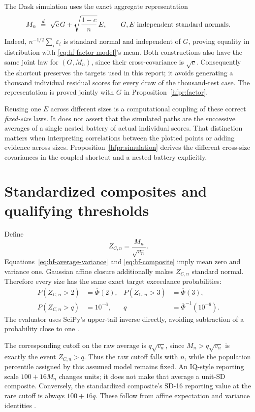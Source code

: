 The Dask simulation uses the exact aggregate representation
\begin{equation}
 M_n\ \stackrel{d}{=}\ \sqrt c\,G+
        \sqrt{\frac{1-c}{n}}\,E,
 \qquad G,E\ \hbox{independent standard normals}.
 \label{eq:hf-aggregate}
\end{equation}
Indeed, \(n^{-1/2}\sum_i\varepsilon_i\) is standard normal and independent
of \(G\), proving equality in distribution with
\eqref{eq:hf-factor-model}'s mean. Both constructions also have the same
joint law for \((G,M_n)\), since their cross-covariance is \(\sqrt c\).
Consequently the shortcut preserves the targets used in this report; it
avoids generating a thousand individual residual scores for every draw of
the thousand-test case.
The representation is proved jointly with \(G\) in
Proposition~\ref{hfpr:factor}.

Reusing one \(E\) across different sizes is a computational coupling of
these correct \emph{fixed-size} laws. It does not assert that the simulated
paths are the successive averages of a single nested battery of actual
individual scores. That distinction matters when interpreting correlations
between the plotted points or adding evidence across sizes.
Proposition~\ref{hfpr:simulation} derives the different cross-size
covariances in the coupled shortcut and a nested battery explicitly.

\section{Standardized composites and qualifying thresholds}
Define
\begin{equation}
 Z_{C,n}=\frac{M_n}{\sqrt{v_n}}.
 \label{eq:hf-composite}
\end{equation}
Equations~\eqref{eq:hf-average-variance} and \eqref{eq:hf-composite}
imply mean zero and variance one. Gaussian affine closure additionally
makes \(Z_{C,n}\) standard normal. Therefore every size has the same exact
target exceedance probabilities:
\begin{align}
 P(Z_{C,n}>2)&=\overline\Phi(2),&
 P(Z_{C,n}>3)&=\overline\Phi(3),\\
 P(Z_{C,n}>q)&=10^{-6},&
 q&=\overline\Phi^{-1}(10^{-6}).
 \label{eq:hf-tail-targets}
\end{align}
The evaluator uses SciPy's upper-tail inverse directly, avoiding subtraction
of a probability close to one \citep{scipystats}.

The corresponding cutoff on the raw average is \(q\sqrt{v_n}\), since
\(M_n>q\sqrt{v_n}\) is exactly the event \(Z_{C,n}>q\).
Thus the raw cutoff falls with \(n\), while the population percentile
assigned by this assumed model remains fixed. An IQ-style reporting scale
\(100+16M_n\) changes units; it does not make that average a unit-SD
composite. Conversely, the standardized composite's SD-16 reporting value
at the rare cutoff is always \(100+16q\). These follow from affine
expectation and variance identities \citep[Section 1.6]{durrett2019}.

